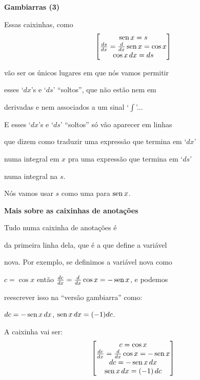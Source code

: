 \documentclass[oneside,12pt]{article}
\begin{document}
\newpage


{\bf Gambiarras (3)}

Essas caixinhas, como
%
$$\left [\begin{matrix}
  \operatorname{sen} x = s \\
  \frac{ds}{dx} = \frac{d}{dx} \operatorname{sen} x = \cos x \\
  \cos x \, dx = ds \\
  \end{matrix}\right ]
$$

vão ser os únicos lugares em que nós vamos permitir

esses `$dx$'s e `$ds$' ``soltos'', que não estão nem em

derivadas e nem associados a um sinal `$∫$'...

\msk

E esses `$dx$'s e `$ds$' ``soltos'' só vão aparecer em linhas

que dizem como traduzir uma expressão que termina em `$dx$'

numa integral em $x$ pra uma expressão que termina em `$ds$'

numa integral na  $s$.

\msk

Nós vamos  usar $s$ como uma  para $\operatorname{sen} x$.


\newpage

{\bf Mais sobre as caixinhas de anotações}

Tudo numa caixinha de anotações é 

da primeira linha dela, que é a que define a variável

nova. Por exemplo, se definimos a variável nova como

$c=\cos x$ então $\frac{dc}{dx} = \frac{d}{dx} \cos x = - \operatorname{sen} x$, e podemos

reescrever isso na ``versão gambiarra'' como:

$dc = - \operatorname{sen} x \, dx$,  $\operatorname{sen} x \, dx = (-1) dc$.

\msk

A caixinha vai ser:
%
$$\left [\begin{matrix}c = \cos x \\
        \frac{dc}{dx} = \frac{d}{dx} \cos x = - \operatorname{sen} x \\
        dc = - \operatorname{sen} x \, dx \\
        \operatorname{sen} x \, dx = (-1) \, dc \\
       \end{matrix}\right ]
$$
\end{document}
